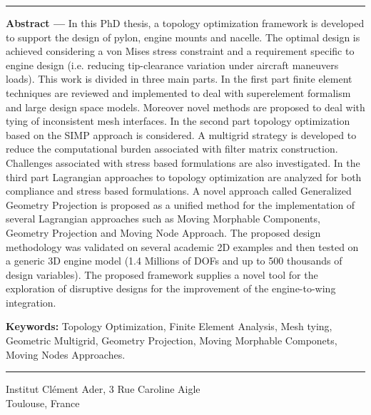 \begin{vcenterpage}
\noindent\rule[2pt]{\textwidth}{0.5pt}
{\large\textbf{Abstract ---}}
      In this PhD thesis, a topology optimization framework is developed to support the design of pylon, engine mounts and nacelle. The optimal design is achieved considering a von Mises stress constraint and a requirement specific to engine design (i.e. reducing tip-clearance variation under aircraft maneuvers loads).  This work is divided in three main parts. In the first part finite element techniques are reviewed and implemented to deal with superelement formalism and large design space models. Moreover novel methods are proposed to deal with tying of inconsistent mesh interfaces. In the second part topology optimization based on the SIMP approach is considered. A multigrid strategy is developed to reduce the computational burden associated with filter matrix construction. Challenges associated with stress based formulations are also investigated. In the third part Lagrangian approaches to topology optimization are analyzed for both compliance and stress based formulations. A novel approach called Generalized Geometry Projection is proposed as a unified method for the implementation of several Lagrangian approaches such as Moving Morphable Components, Geometry Projection and Moving Node Approach. The proposed design methodology was validated on several academic 2D examples and then tested on a generic 3D engine model (1.4 Millions of DOFs and up to 500 thousands of design variables). The proposed framework supplies a novel tool for the exploration of disruptive designs for the improvement of the engine-to-wing integration.  
    
{\large\textbf{Keywords:}}
   Topology Optimization, Finite Element Analysis, Mesh tying, Geometric Multigrid, Geometry Projection, Moving Morphable Componets, Moving Nodes Approaches.
\\
\noindent\rule[2pt]{\textwidth}{0.5pt}
\begin{center}
 Institut Clément Ader, 3 Rue Caroline Aigle\\
 Toulouse, France
\end{center}
\end{vcenterpage}

